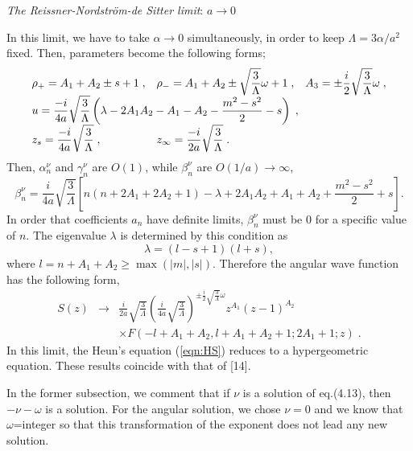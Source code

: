 \noindent 
{\it The Reissner-Nordstr\"om-de Sitter limit}: $a \rightarrow 0$ 

In this limit, we have to take $\alpha \rightarrow 0$ simultaneously, 
in order to keep $\Lambda=3\alpha/a^2$ fixed. 
Then, parameters become the following forms;
%
\begin{eqnarray}
\begin{array}{lll}
\rho_+ = A_1+A_2\pm s+1\;,& 
\rho_- = \displaystyle{A_1+A_2 
\pm \sqrt{\frac{3}{\Lambda}}\omega+1}\;,& 
A_3 = \displaystyle{\pm\frac{i}{2}}\sqrt{\frac{3}{\Lambda}}\omega\;, \\
\multicolumn{3}{l}{\displaystyle{
u=  \frac{-i}{4a}\sqrt{\frac{3}{\Lambda}} \left(
\lambda-2A_1A_2-A_1-A_2-\frac{m^2-s^2}{2}-s \right)\;,}} \\
z_s = \displaystyle{\frac{-i}{4a}\sqrt{\frac{3}{\Lambda}}}\;,& 
z_\infty = \displaystyle{\frac{-i}{2a}\sqrt{\frac{3}{\Lambda}}}\;.& 
\end{array}
\end{eqnarray}
%
Then, $\alpha^\nu_n$ and $\gamma^\nu_n$ are $O(1)$, while 
$\beta^\nu_n$ are $O(1/a)\to \infty$,  
%
\begin{equation}
\beta^\nu_n = \frac{i}{4a}\sqrt{\frac{3}{\Lambda}}\left[
n(n+2A_1+2A_2+1)-\lambda+2A_1A_2+A_1+A_2 +\frac{m^2-s^2}{2}+s \right].
\end{equation}
%
In order that coefficients $a_n$ have definite limits, 
$\beta^\nu_n$ must be 0 for a specific value of $n$.
The eigenvalue $\lambda$ is determined by this condition as
%
\begin{equation}
\lambda=(l-s+1)(l+s), \label{eqn:lambda-ds}
\end{equation}
%
where $l=n+A_1+A_2 \geq \max(|m|,|s|)$.
Therefore the angular wave function has the following form,
%
\begin{eqnarray}
S(z)&\rightarrow&\frac{i}{2a}\sqrt{\frac{3}{\Lambda}} 
\left( \frac{i}{4a}\sqrt{\frac{3}{\Lambda}} \right)^
{\pm\frac{i}{2}\sqrt{\frac{3}{\Lambda}}\omega} z^{A_1} (z-1)^{A_2}\\
 && \times F(-l+A_1+A_2, l+A_1+A_2+1; 2A_1+1; z)\;. 
\end{eqnarray}
%
In this limit, the Heun's equation (\ref{eqn:HS}) reduces to a 
hypergeometric equation. These results coincide with that of [14].

In the former subsection, we comment that if $\nu$ is a solution 
of eq.(4.13), then $-\nu-\omega$ is a solution. For the angular 
solution, we chose $\nu=0$ and we know that $\omega$=integer so 
that this transformation of the exponent does not lead any new 
solution. 

